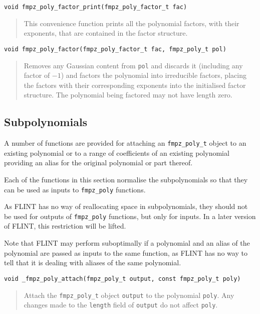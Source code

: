 \documentclass[a4paper,10pt]{article}
\newcommand{\code}{\lstinline}
\begin{document}
\begin{lstlisting}
void fmpz_poly_factor_print(fmpz_poly_factor_t fac)
\end{lstlisting}
\begin{quote}
This convenience function prints all the polynomial factors, with their exponents, that are contained in
the factor structure.
\end{quote}

\begin{lstlisting}
void fmpz_poly_factor(fmpz_poly_factor_t fac, fmpz_poly_t pol)
\end{lstlisting}
\begin{quote}
Removes any Gaussian content from \code{pol} and discards it (including any factor of $-1$) and factors
the polynomial into irreducible factors, placing the factors with their corresponding exponents into the
initialised factor structure. The polynomial being factored may not have length zero.
\end{quote}

\subsection{Subpolynomials}
A number of functions are provided for attaching an \code{fmpz_poly_t} object to an existing polynomial or to a range of coefficients of an existing polynomial providing an alias for the original polynomial or part thereof. 

Each of the functions in this section normalise the subpolynomials so that they can be used as inputs to \code{fmpz_poly} functions. 

As FLINT has no way of reallocating space in subpolynomials, they should not be used for outputs of \code{fmpz_poly} functions, but only for inputs. In a later version of FLINT, this restriction will be lifted.

Note that FLINT may perform suboptimally if a polynomial and an alias of the polynomial are passed as inputs to the same function, as FLINT has no way to tell that it is dealing with aliases of the same polynomial.

\begin{lstlisting}
void _fmpz_poly_attach(fmpz_poly_t output, const fmpz_poly_t poly)
\end{lstlisting}
\begin{quote}
Attach the \code{fmpz_poly_t} object \code{output} to the polynomial \code{poly}. Any changes made to the \code{length} field of \code{output} do not affect \code{poly}.
\end{quote}
\end{document}
